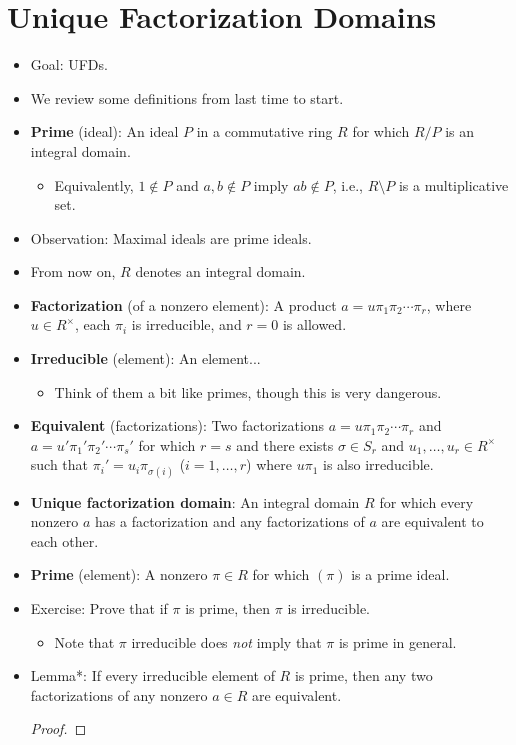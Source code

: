 \documentclass[../notes.tex]{subfiles}
\begin{document}
\section{Unique Factorization Domains}
\begin{itemize}
    \item {}Goal: UFDs.
    \item We review some definitions from last time to start.
    \item \textbf{Prime} (ideal): An ideal $P$ in a commutative ring $R$ for which $R/P$ is an integral domain.
    \begin{itemize}
        \item Equivalently, $1\notin P$ and $a,b\notin P$ imply $ab\notin P$, i.e., $R\setminus P$ is a multiplicative set.
    \end{itemize}
    \item Observation: Maximal ideals are prime ideals.
    \item From now on, $R$ denotes an integral domain.
    \item \textbf{Factorization} (of a nonzero element): A product $a=u\pi_1\pi_2\cdots\pi_r$, where $u\in R^\times$, each $\pi_i$ is irreducible, and $r=0$ is allowed.
    \item \textbf{Irreducible} (element): An element...
    \begin{itemize}
        \item Think of them a bit like primes, though this is very dangerous.
    \end{itemize}
    \item \textbf{Equivalent} (factorizations): Two factorizations $a=u\pi_1\pi_2\cdots\pi_r$ and $a=u'\pi_1'\pi_2'\cdots\pi_s'$ for which $r=s$ and there exists $\sigma\in S_r$ and $u_1,\dots,u_r\in R^\times$ such that $\pi_i'=u_i\pi_{\sigma(i)}$ ($i=1,\dots,r$) where $u\pi_1$ is also irreducible.
    \item \textbf{Unique factorization domain}: An integral domain $R$ for which every nonzero $a$ has a factorization and any factorizations of $a$ are equivalent to each other.
    \item \textbf{Prime} (element): A nonzero $\pi\in R$ for which $(\pi)$ is a prime ideal.
    \item Exercise: Prove that if $\pi$ is prime, then $\pi$ is irreducible.
    \begin{itemize}
        \item Note that $\pi$ irreducible does \emph{not} imply that $\pi$ is prime in general.
    \end{itemize}
    \item Lemma*: If every irreducible element of $R$ is prime, then any two factorizations of any nonzero $a\in R$ are equivalent.
    \begin{proof}


\end{proof}
\end{itemize}
\end{document}
